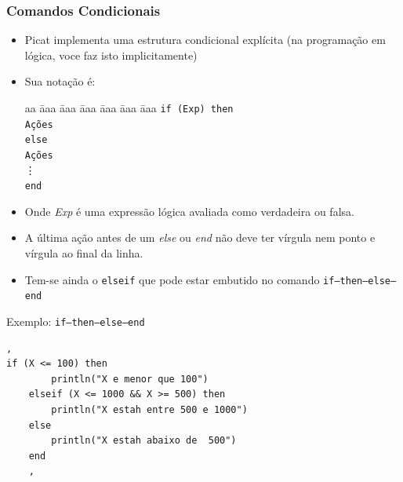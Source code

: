 \begin{frame}[fragile]
\frametitle{Comandos Condicionais}
    
    \begin{itemize}
        
        \item Picat implementa uma  estrutura condicional explícita (na programação em lógica, voce faz isto implicitamente)
        
        \pause
        \item Sua notação é:\\
        
        \begin{tabbing}
            aa \= aaa \= aaa \= aaa \= aaa \= aaa \= aaa \kill
            \> \texttt{if (Exp) then}\\
            \> \> \texttt{Ações} \\
            \> \texttt{else}\\
            \> \> \texttt{Ações}\\
            \> \vdots\\
            \> \texttt{end} 
        \end{tabbing}
        
        \pause
        \item Onde \emph{Exp} é uma expressão lógica  avaliada como verdadeira ou  falsa.
     
     \pause   
        \item A última ação antes de um \emph{else} ou \emph{end} não deve ter  vírgula nem ponto e vírgula ao final da linha.
  
     \pause   
        \item Tem-se ainda o \texttt{elseif} que pode estar embutido no comando \texttt{if--then--else--end}
        
    \end{itemize}
\end{frame}    
    
    
    
    
    
    
    
    
\begin{frame}[fragile]

\begin{block}{Exemplo: \texttt{if--then--else--end} }
     
\begin{lstlisting}[frame=single]
    ,
if (X <= 100) then
        println("X e menor que 100")
    elseif (X <= 1000 && X >= 500) then
        println("X estah entre 500 e 1000")
    else
        println("X estah abaixo de  500")
    end
    ,
\end{lstlisting}
        
\end{block}
\end{frame}    

